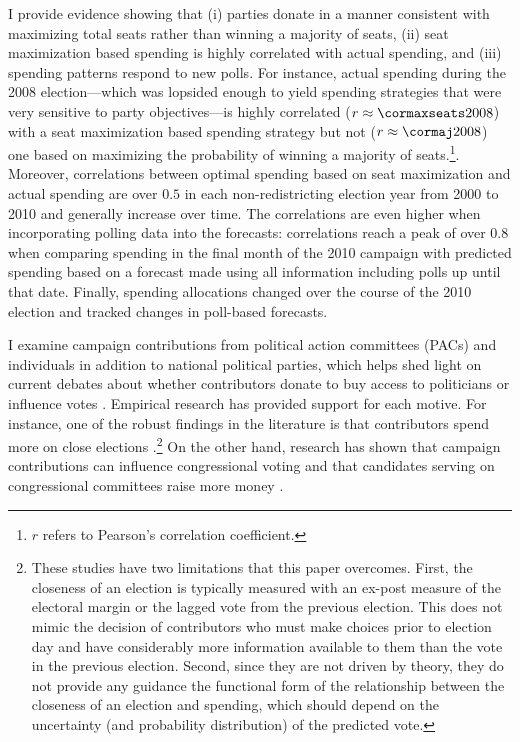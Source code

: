 \documentclass[12pt,final,fleqn]{article}
\theoremstyle{plain}
\begin{document}
I provide evidence showing that (i) parties donate in a manner consistent with maximizing total seats rather than winning a majority of seats, (ii) seat maximization based spending is highly correlated with actual spending, and (iii) spending patterns respond to new polls. For instance, actual spending during the 2008 election---which was lopsided enough to yield spending strategies that were very sensitive to party objectives---is highly correlated ($r \approx \cormaxseats2008$) with a seat maximization based spending strategy but not ($r \approx \cormaj2008$) one based on maximizing the probability of winning a majority of seats.\footnote{$r$ refers to Pearson's correlation coefficient.}. Moreover, correlations between optimal spending based on seat maximization and actual spending are over $0.5$ in each non-redistricting election year from 2000 to 2010 and generally increase over time. The correlations are even higher when incorporating polling data into the forecasts: correlations reach a peak of over 0.8 when comparing spending in the final month of the 2010 campaign with predicted spending based on a forecast made using all information including polls up until that date. Finally, spending allocations changed over the course of the 2010 election and tracked changes in poll-based forecasts.  

I examine campaign contributions from political action committees (PACs) and individuals in addition to national political parties, which helps shed light on current debates about whether contributors donate to buy access to politicians or influence votes \citep[e.g.,][]{stratmann2005some}. Empirical research has provided support for each motive. For instance, one of the robust findings in the literature is that contributors spend more on close elections \citep{jacobson1985money,kau1982general, poole1985patterns, stratmann1991campaign}.\footnote{These studies have two limitations that this paper overcomes. First, the closeness of an election is typically measured with an ex-post measure of the electoral margin or the lagged vote from the previous election. This does not mimic the decision of contributors who must make choices prior to election day and have considerably more information available to them than the vote in the previous election. Second, since they are not driven by theory, they do not provide any guidance the functional form of the relationship between the closeness of an election and spending, which should depend on the uncertainty (and probability distribution) of the predicted vote.} On the other hand, research has shown that campaign contributions can influence congressional voting \citep{facchini2011interest, mian2010Apolitical, richter2009lobbying} and that candidates serving on congressional committees raise more money \citep{grier1991committee,kroszner1998interest, romer1994empirical}. 
\end{document}
